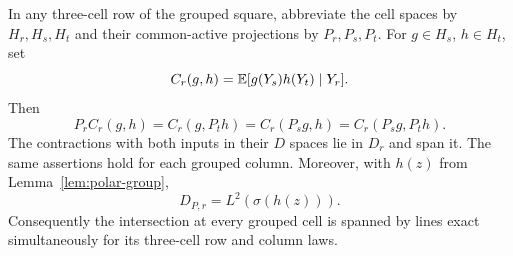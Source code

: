 \begin{lemma}\label{lem:contraction-completeness}
In any three-cell row of the grouped square, abbreviate the cell spaces
by $H_r,H_s,H_t$ and their common-active projections by $P_r,P_s,P_t$.
For $g\in H_s$, $h\in H_t$, set
\[
 C_r(g,h)=\mathbb E[g(Y_s)h(Y_t)\mid Y_r].
\]
Then
\begin{equation}\label{eq:contraction-projections}
 P_rC_r(g,h)=C_r(g,P_th)=C_r(P_sg,h)=C_r(P_sg,P_th).
\end{equation}
The contractions with both inputs in their $D$ spaces lie in $D_r$ and
span it.  The same assertions hold for each grouped column.
Moreover, with $h(z)$ from Lemma~\ref{lem:polar-group},
\begin{equation}\label{eq:corner-completeness}
 D_{P,r}=L^2(\sigma(h(z))).
\end{equation}
Consequently the intersection at every grouped cell is spanned by lines
exact simultaneously for its three-cell row and column laws.
\end{lemma}

